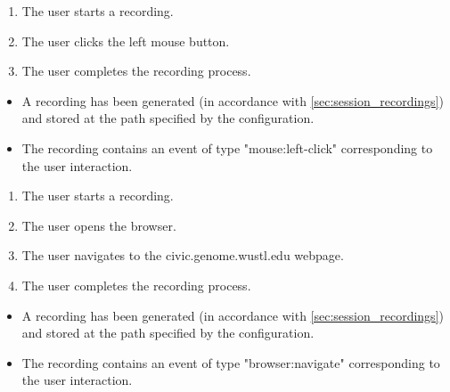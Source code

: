 \begin{tests}
    {\begin{enumerate}
        \item The \gls{user} starts a recording.
        \item The \gls{user} clicks the left mouse button.
        \item The \gls{user} completes the recording process.
    \end{enumerate}}
    {\begin{itemize}
        \item A recording has been generated (in accordance with \ref{sec:session_recordings}) and stored at the path specified by the configuration.
        \item The recording contains an \gls{event} of type "mouse:left-click" corresponding to the \gls{user} interaction.
    \end{itemize}}
\newpage
    {\begin{enumerate}
        \item The \gls{user} starts a recording.
        \item The \gls{user} opens the \gls{browser}.
        \item The \gls{user} navigates to the civic.genome.wustl.edu webpage.
        \item The \gls{user} completes the recording process.
    \end{enumerate}}
    {\begin{itemize}
        \item A recording has been generated (in accordance with \ref{sec:session_recordings}) and stored at the path specified by the configuration.
        \item The recording contains an \gls{event} of type "browser:navigate" corresponding to the \gls{user} interaction.
    \end{itemize}}


\end{tests}
